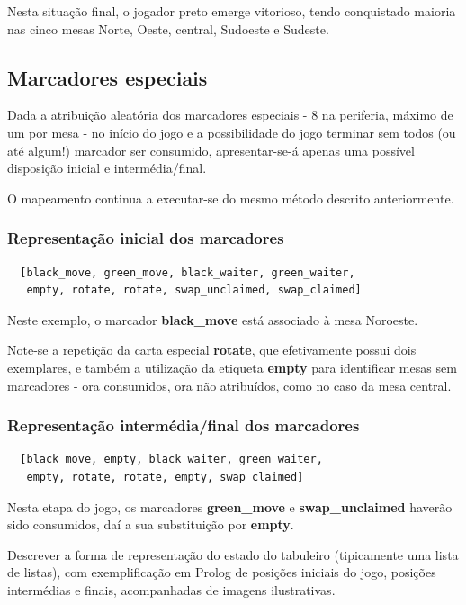 \documentclass[a4paper]{article}
\begin{document}
Nesta situação final, o jogador preto emerge vitorioso, tendo conquistado maioria nas cinco mesas Norte, Oeste, central, Sudoeste e Sudeste. \newline

\subsection{Marcadores especiais}
Dada a atribuição aleatória dos marcadores especiais - 8 na periferia, máximo de um por mesa - no início do jogo e a possibilidade do jogo terminar sem todos (ou até algum!) marcador ser consumido, apresentar-se-á apenas uma possível disposição inicial e intermédia/final.

O mapeamento continua a executar-se do mesmo método descrito anteriormente.

\subsubsection{Representação inicial dos marcadores}
\begin{lstlisting}
  [black_move, green_move, black_waiter, green_waiter, 
   empty, rotate, rotate, swap_unclaimed, swap_claimed]
\end{lstlisting}

Neste exemplo, o marcador \textbf{black\_move} está associado à mesa Noroeste.

Note-se a repetição da carta especial \textbf{rotate}, que efetivamente possui dois exemplares, e também a utilização da etiqueta \textbf{empty} para identificar mesas sem marcadores - ora consumidos, ora não atribuídos, como no caso da mesa central. \newline

\subsubsection{Representação intermédia/final dos marcadores}
\begin{lstlisting}
  [black_move, empty, black_waiter, green_waiter, 
   empty, rotate, rotate, empty, swap_claimed]
\end{lstlisting}

Nesta etapa do jogo, os marcadores \textbf{green\_move} e \textbf{swap\_unclaimed} haverão sido consumidos, daí a sua substituição por \textbf{empty}.

Descrever a forma de representação do estado do tabuleiro (tipicamente uma lista de listas), com exemplificação em Prolog de posições iniciais do jogo, posições intermédias e finais, acompanhadas de imagens ilustrativas. \newline
\end{document}

